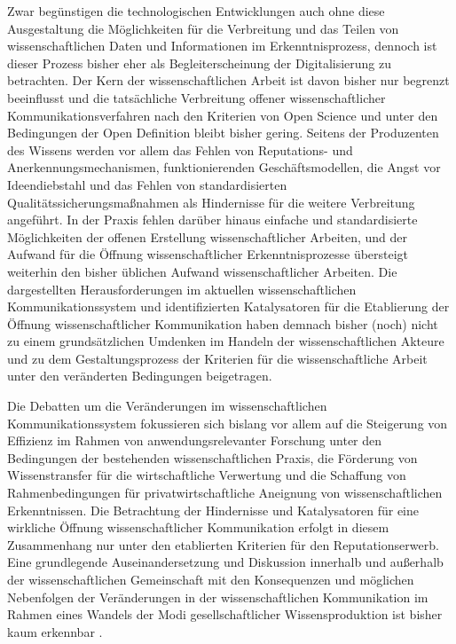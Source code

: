 Zwar begünstigen die technologischen Entwicklungen auch ohne diese Ausgestaltung die Möglichkeiten für die Verbreitung und das Teilen von wissenschaftlichen Daten und Informationen im Erkenntnisprozess, dennoch ist dieser Prozess bisher eher als Begleiterscheinung der Digitalisierung zu betrachten. Der Kern der wissenschaftlichen Arbeit ist davon bisher nur begrenzt beeinflusst und die tatsächliche Verbreitung offener wissenschaftlicher Kommunikationsverfahren nach den Kriterien von Open Science und unter den Bedingungen der Open Definition bleibt bisher gering. Seitens der Produzenten des Wissens werden vor allem das Fehlen von Reputations- und Anerkennungsmechanismen, funktionierenden Geschäftsmodellen, die Angst vor Ideendiebstahl und das Fehlen von standardisierten Qualitätssicherungsmaßnahmen als Hindernisse für die weitere Verbreitung angeführt. In der Praxis fehlen darüber hinaus einfache und standardisierte Möglichkeiten der offenen Erstellung wissenschaftlicher Arbeiten, und der Aufwand für die Öffnung wissenschaftlicher Erkenntnisprozesse übersteigt weiterhin den bisher üblichen Aufwand wissenschaftlicher Arbeiten. Die dargestellten Herausforderungen im aktuellen wissenschaftlichen Kommunikationssystem und identifizierten Katalysatoren für die Etablierung der Öffnung wissenschaftlicher Kommunikation haben demnach bisher (noch) nicht zu einem grundsätzlichen Umdenken im Handeln der wissenschaftlichen Akteure und zu dem Gestaltungsprozess der Kriterien für die wissenschaftliche Arbeit unter den veränderten Bedingungen beigetragen.

Die Debatten um die Veränderungen im wissenschaftlichen Kommunikationssystem fokussieren sich bislang vor allem auf die Steigerung von Effizienz im Rahmen von anwendungsrelevanter Forschung unter den Bedingungen der bestehenden wissenschaftlichen Praxis, die Förderung von Wissenstransfer für die wirtschaftliche Verwertung und die Schaffung von Rahmenbedingungen für privatwirtschaftliche Aneignung von wissenschaftlichen Erkenntnissen. Die Betrachtung der Hindernisse und Katalysatoren für eine wirkliche Öffnung wissenschaftlicher Kommunikation erfolgt in diesem Zusammenhang nur unter den etablierten Kriterien für den Reputationserwerb. Eine grundlegende Auseinandersetzung und Diskussion innerhalb und außerhalb der wissenschaftlichen Gemeinschaft mit den Konsequenzen und möglichen Nebenfolgen der Veränderungen in der wissenschaftlichen Kommunikation im Rahmen eines Wandels der Modi gesellschaftlicher Wissensproduktion ist bisher kaum erkennbar \cite{Buss_2001}.
